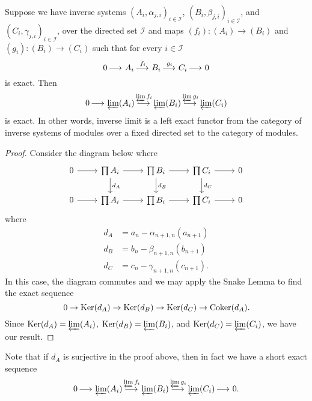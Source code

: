 \documentclass{ximera}
\begin{document}
\begin{proposition} \label{invlimleftexact}
Suppose we have inverse systems $(A_i,\alpha_{j,i})_{i \in \mathcal{I}}$,
$(B_i,\beta_{j,i})_{i \in \mathcal{I}}$, and $(C_i,\gamma_{j,i})_{i \in
  \mathcal{I}}$, over the directed set $\mathcal{I}$ and maps
$(f_i):(A_i) \to (B_i)$ and $(g_i):(B_i)
\to (C_i)$ such that for every $i \in \mathcal{I}$
\[
0 \mathop{\longrightarrow\,}\limits A_i \mathop{\longrightarrow\,}\limits^{f_i} B_i \mathop{\longrightarrow\,}\limits^{g_i} C_i\mathop{\longrightarrow\,}\limits 0
\]
is exact.  Then
\[
0 \mathop{\longrightarrow\,}\limits \varprojlim(A_i) \mathop{\longrightarrow\,}\limits^{\varprojlim f_i} \varprojlim(B_i) \mathop{\longrightarrow\,}\limits^{\varprojlim g_i} \varprojlim(C_i)
\]
is exact.  In other words, inverse limit is a left exact functor from
the category of inverse systems of modules over a fixed directed set
to the category of modules.
\begin{proof}
  Consider the diagram below where
  \[
  \begin{tikzcd}
    0 \ar[r] & \prod A_i  \ar[r]  \ar[d,"d_A"] &   \prod B_i \ar[r]  \ar[d,"d_B"] &  \prod C_i  \ar[r] \ar[d,"d_C"] & 0\\
    0 \ar[r] & \prod A_i  \ar[r]  &   \prod B_i \ar[r]  &  \prod C_i  \ar[r] & 0
  \end{tikzcd}
  \]
  where
  \begin{align*}
    d_A &= a_n-\alpha_{n+1,n}(a_{n+1})\\
    d_B &= b_n-\beta_{n+1,n}(b_{n+1})\\
    d_C &= c_n-\gamma_{n+1,n}(c_{n+1}).
  \end{align*}
  In this case, the diagram commutes and we may apply the 
  Snake Lemma to find the exact sequence
  \[
  0 \to \mathop{\mathrm{Ker}}\nolimits(d_A) \to \mathop{\mathrm{Ker}}\nolimits(d_B) \to \mathop{\mathrm{Ker}}\nolimits(d_C) \to \mathop{\mathrm{Coker}}\nolimits(d_A).
  \]
  Since $\mathop{\mathrm{Ker}}\nolimits(d_A) = \varprojlim(A_i)$, $\mathop{\mathrm{Ker}}\nolimits(d_B) = \varprojlim(B_i)$, and
  $\mathop{\mathrm{Ker}}\nolimits(d_C) = \varprojlim(C_i)$, we have our result.
\end{proof}
\end{proposition}

\begin{remark}
  Note that if $d_A$ is surjective in the proof above, then in fact we
  have a short exact sequence
  \[
  0 \mathop{\longrightarrow\,}\limits \varprojlim(A_i) \mathop{\longrightarrow\,}\limits^{\varprojlim f_i} \varprojlim(B_i) \mathop{\longrightarrow\,}\limits^{\varprojlim g_i} \varprojlim(C_i) \mathop{\longrightarrow\,}\limits 0.
  \]
\end{remark}
\end{document}
